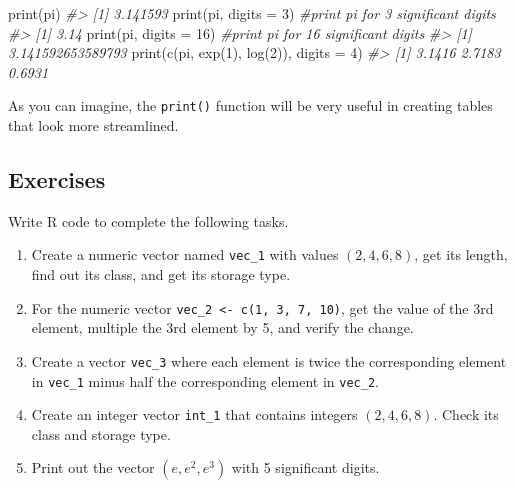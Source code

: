 \documentclass[
]{book}
\newenvironment{Shaded}{\begin{snugshade}}{\end{snugshade}}
\newcommand{\AttributeTok}[1]{\textcolor[rgb]{0.77,0.63,0.00}{#1}}
\newcommand{\CommentTok}[1]{\textcolor[rgb]{0.56,0.35,0.01}{\textit{#1}}}
\newcommand{\DecValTok}[1]{\textcolor[rgb]{0.00,0.00,0.81}{#1}}
\newcommand{\FunctionTok}[1]{\textcolor[rgb]{0.00,0.00,0.00}{#1}}
\newcommand{\NormalTok}[1]{#1}
\begin{document}
\begin{Shaded}
\begin{Highlighting}[]
\FunctionTok{print}\NormalTok{(pi)}
\CommentTok{\#\textgreater{} [1] 3.141593}
\FunctionTok{print}\NormalTok{(pi, }\AttributeTok{digits =} \DecValTok{3}\NormalTok{)            }\CommentTok{\#print pi for 3 significant digits}
\CommentTok{\#\textgreater{} [1] 3.14}
\FunctionTok{print}\NormalTok{(pi, }\AttributeTok{digits =} \DecValTok{16}\NormalTok{)           }\CommentTok{\#print pi for 16 significant digits}
\CommentTok{\#\textgreater{} [1] 3.141592653589793}
\FunctionTok{print}\NormalTok{(}\FunctionTok{c}\NormalTok{(pi, }\FunctionTok{exp}\NormalTok{(}\DecValTok{1}\NormalTok{), }\FunctionTok{log}\NormalTok{(}\DecValTok{2}\NormalTok{)), }\AttributeTok{digits =} \DecValTok{4}\NormalTok{)}
\CommentTok{\#\textgreater{} [1] 3.1416 2.7183 0.6931}
\end{Highlighting}
\end{Shaded}

As you can imagine, the \texttt{print()} function will be very useful in creating tables that look more streamlined.

\hypertarget{exercises-3}{%
\subsection{Exercises}\label{exercises-3}}

Write R code to complete the following tasks.

\begin{enumerate}
\def\labelenumi{\arabic{enumi}.}
\item
  Create a numeric vector named \texttt{vec\_1} with values \((2, 4, 6, 8)\), get its length, find out its class, and get its storage type.
\item
  For the numeric vector \texttt{vec\_2\ \textless{}-\ c(1,\ 3,\ 7,\ 10)}, get the value of the 3rd element, multiple the 3rd element by 5, and verify the change.
\item
  Create a vector \texttt{vec\_3} where each element is twice the corresponding element in \texttt{vec\_1} minus half the corresponding element in \texttt{vec\_2}.
\item
  Create an integer vector \texttt{int\_1} that contains integers \((2, 4, 6, 8)\). Check its class and storage type.
\item
  Print out the vector \((e, e^2, e^3)\) with 5 significant digits.
\end{enumerate}
\end{document}
